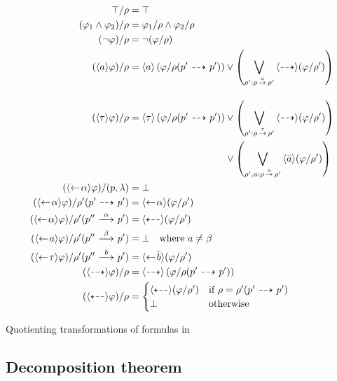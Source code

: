 \begin{table}[t]
    \begin{align*}
        \true / \rho &= \true \\
        (\phi_1 \land \phi_2)/\rho &= \phi_1/\rho  \land \phi_2 / \rho \\
        (\neg\phi)/\rho &= \neg(\phi/\rho) \\
        (\dmnd{a}\phi) / \rho &= \dmnd{a} \left(\phi / \rho(p'\ptrans{} p')\right)
            \lor \left(\bigvee_{\rho' : \rho\transshort{a}\rho'} \pdmnd{} (\phi/\rho') \right)
        \\[1em]
        (\dmnd{\tau}\phi) / \rho &= \dmnd{\tau} \left(\phi / \rho(p'\ptrans{} p')\right)
            \lor \left(\bigvee_{\rho' : \rho\transshort{\tau}\rho'} \pdmnd{} (\phi/\rho') \right) \\
            &\phantom{= \dmnd{\tau} \left(\phi / \rho(p'\ptrans{} p')\right)\;}
            \lor \left( \bigvee_{\rho',a : \rho \transshort{a} \rho'} \dmnd{\bar{a}} (\phi/\rho')  \right) \\
        (\dmndback{\alpha}\phi) / (p,\lambda) &= \false \\
        (\dmndback{\alpha}\phi) / \rho'(p'\ptrans{} p') &= \dmndback{\alpha} (\phi / \rho') \\
        (\dmndback{\alpha}\phi) / \rho'(p''\trans{\alpha} p') &= \pdmndback{} (\phi / \rho') \\
        (\dmndback{a}\phi) / \rho'(p'' \trans{\beta} p') &= \false \quad\textrm{where $a\ne \beta$} \\
        (\dmndback{\tau}\phi) / \rho'(p'' \trans{b} p') &= \dmndback{\bar{b}} (\phi/\rho') \\
        (\pdmnd{}\phi) / \rho &= \pdmnd{} \left( \phi / \rho(p'\ptrans{} p') \right) \\
        (\pdmndback{}\phi) / \rho &= \begin{cases}
            \pdmndback{} (\phi / \rho') & \textrm{if $\rho = \rho'(p' \ptrans{} p')$} \\
            \false & \textrm{otherwise}
        \end{cases}
    \end{align*}
    \caption{Quotienting transformations of formulas in \HMLpp}
    \label{tab:quotients}
\end{table}


\subsection{Decomposition theorem}\label{sub:theorem}

